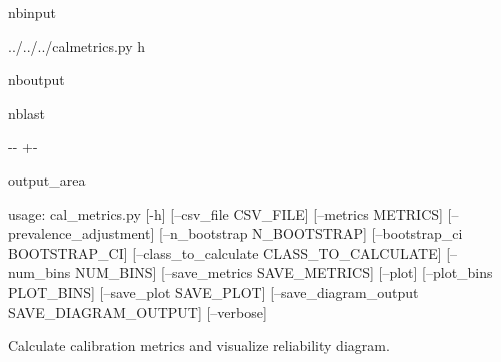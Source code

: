 \documentclass[letterpaper,10pt,english]{sphinxmanual}
\begin{document}
\begin{sphinxuseclass}{nbinput}
{
\begin{sphinxVerbatim}[commandchars=\\\{\}]
\llap{\color{nbsphinxin}[7]:\,\hspace{\fboxrule}\hspace{\fboxsep}}
 ../../../cal\PYGZus{}metrics.py \PYGZhy{}h
\end{sphinxVerbatim}
}

\end{sphinxuseclass}
\begin{sphinxuseclass}{nboutput}
\begin{sphinxuseclass}{nblast}
{

\kern-\sphinxverbatimsmallskipamount\kern-\baselineskip
\kern+\FrameHeightAdjust\kern-\fboxrule
\vspace{\nbsphinxcodecellspacing}

\begin{sphinxuseclass}{output_area}
\begin{sphinxuseclass}{}


\begin{sphinxVerbatim}[commandchars=\\\{\}]
usage: cal\_metrics.py [-h] [--csv\_file CSV\_FILE] [--metrics METRICS]
                      [--prevalence\_adjustment] [--n\_bootstrap N\_BOOTSTRAP]
                      [--bootstrap\_ci BOOTSTRAP\_CI]
                      [--class\_to\_calculate CLASS\_TO\_CALCULATE]
                      [--num\_bins NUM\_BINS] [--save\_metrics SAVE\_METRICS]
                      [--plot] [--plot\_bins PLOT\_BINS] [--save\_plot SAVE\_PLOT]
                      [--save\_diagram\_output SAVE\_DIAGRAM\_OUTPUT] [--verbose]

Calculate calibration metrics and visualize reliability diagram.


\end{sphinxVerbatim}
\end{sphinxuseclass}
\end{sphinxuseclass}}
\end{sphinxuseclass}
\end{sphinxuseclass}
\end{document}
